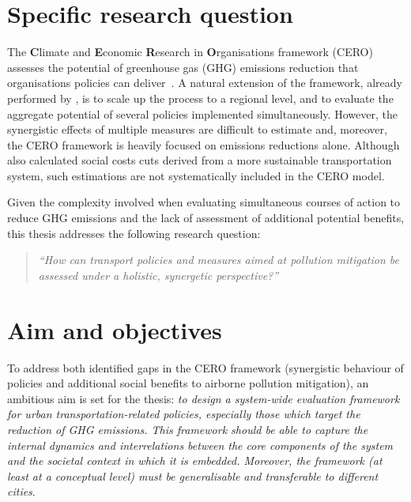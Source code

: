 \section{Specific research question}
\label{s:research-question}
The \textbf{C}limate and \textbf{E}conomic \textbf{R}esearch in \textbf{O}rganisations framework (CERO) assesses the potential of greenhouse gas (GHG) emissions reduction that organisations policies can deliver~\parencite{robert2009cero}. A natural extension of the framework, already performed by \textcite{robert2006stockholm2030,robert2016cero-regional}, is to scale up the process to a regional level, and to evaluate the aggregate potential of several policies implemented simultaneously. However, the synergistic effects of multiple measures are difficult to estimate and, moreover, the CERO framework is heavily focused on  emissions reductions alone. Although \textcite{robert2006stockholm2030} also calculated social costs cuts derived from a more sustainable transportation system, such estimations are not systematically included in the CERO model.

Given the complexity involved when evaluating simultaneous courses of action to reduce GHG emissions and the lack of assessment of additional potential benefits, this thesis addresses the following research question:
%
\blockquote{\textit{``How can transport policies and measures aimed at pollution mitigation be assessed under a holistic, synergetic perspective?''}}

\section{Aim and objectives}
\label{s:aim-objectives}
To address both identified gaps in the CERO framework (synergistic behaviour of policies and additional social benefits to airborne pollution mitigation), an ambitious aim is set for the thesis: \textit{to design a system-wide evaluation framework for urban transportation-related policies, especially those which target the reduction of GHG emissions. This framework should be able to capture the internal dynamics and interrelations between the core components of the system and the societal context in which it is embedded. Moreover, the framework (at least at a conceptual level) must be generalisable and transferable to different cities}.

